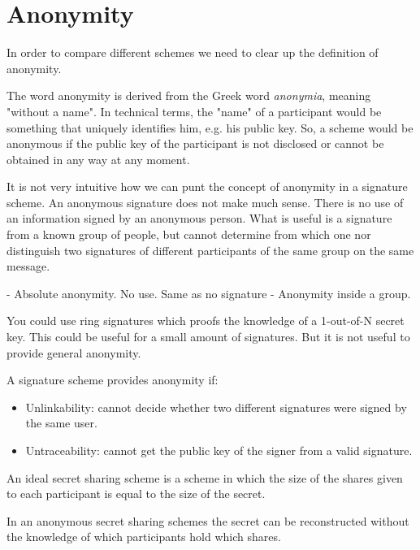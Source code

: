 \section{Anonymity}

In order to compare different schemes we need to clear up the definition of anonymity.

The word anonymity is derived from the Greek word \textit{anonymia}, meaning "without a name". In technical terms, the "name" of a participant would be something that uniquely identifies him, e.g. his public key. So, a scheme would be anonymous if the public key of the participant is not disclosed or cannot be obtained in any way at any moment.

It is not very intuitive how we can punt the concept of anonymity in a signature scheme. An anonymous signature does not make much sense. There is no use of an information signed by an anonymous person. What is useful is a signature from a known group of people, but cannot determine from which one nor distinguish two signatures of different participants of the same group on the same message.

- Absolute anonymity. No use. Same as no signature
- Anonymity inside a group. 



You could use ring signatures which proofs the knowledge of a 1-out-of-N secret key. This could be useful for a small amount of signatures. But it is not useful to provide general anonymity.

A signature scheme provides anonymity if:
\begin{itemize}
    \item Unlinkability: cannot decide whether two different signatures were signed by the same user.
    \item Untraceability: cannot get the public key of the signer from a valid signature.
\end{itemize}

\cite{BlSt97} 

An ideal secret sharing scheme is a scheme in which the size of the shares given to each participant is equal to the size of the secret.

In an anonymous secret sharing schemes the secret can be reconstructed without the knowledge of which participants hold which shares.